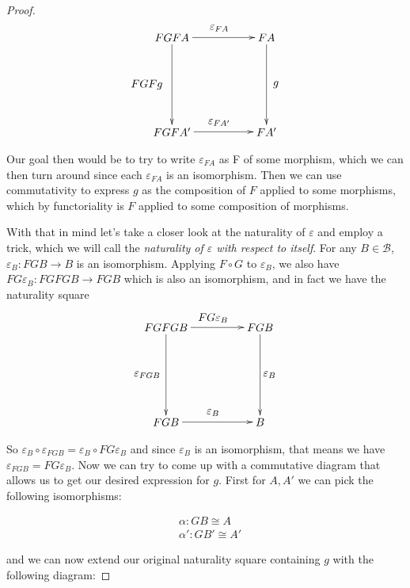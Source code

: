 \documentclass[11pt]{article}
\theoremstyle{definition}
\theoremstyle{plain}
\theoremstyle{plain}
\theoremstyle{plain}
\begin{document}
\begin{proof}
\begin{equation*}
\begin{xy}
(0,0)*+{FGFA}="a"; (30,0)*+{FA}="b";%
(0,-30)*+{FGFA'}="c"; (30,-30)*+{FA'}="d";
{\ar "a"; "b"}?*!/_3mm/{\varepsilon_{FA}};
{\ar "a"; "c"}?*!/^8mm/{FGFg};
{\ar "c"; "d"}?*!/_3mm/{\varepsilon_{FA'}};
{\ar "b";"d"}?*!/_3mm/{g};
\end{xy}
\end{equation*}

Our goal then would be to try to write $\varepsilon_{FA}$ as F of some morphism, which we can then turn around since each $\varepsilon_{FA}$ is an isomorphism. Then we can use commutativity to express $g$ as the composition of $F$ applied to some morphisms, which by functoriality is $F$ applied to some composition of morphisms.

With that in mind let's take a closer look at the naturality of $\varepsilon$ and employ a trick, which we will call the \emph{naturality of $\varepsilon$ with respect to itself}. For any $B\in\mathscr{B}$, $\varepsilon_{B}:FGB\to B$ is an isomorphism. Applying $F\circ G$ to $\varepsilon_{B}$, we also have $FG\varepsilon_{B}:FGFGB\to FGB$ which is also an isomorphism, and in fact we have the naturality square

\begin{equation*}
\begin{xy}
(0,0)*+{FGFGB}="a"; (30,0)*+{FGB}="b";%
(0,-30)*+{FGB}="c"; (30,-30)*+{B}="d";
{\ar "a"; "b"}?*!/_3mm/{FG\varepsilon_{B}};
{\ar "a"; "c"}?*!/^6mm/{\varepsilon_{FGB}};
{\ar "c"; "d"}?*!/_3mm/{\varepsilon_{B}};
{\ar "b";"d"}?*!/_3mm/{\varepsilon_{B}};
\end{xy}
\end{equation*}

So $\varepsilon_{B} \circ \varepsilon_{FGB} = \varepsilon_{B} \circ FG\varepsilon_{B}$ and since $\varepsilon_{B}$ is an isomorphism, that means we have $\varepsilon_{FGB} = FG\varepsilon_{B}$. Now we can try to come up with a commutative diagram that allows us to get our desired expression for $g$. First for $A,A'$ we can pick the following isomorphisms:

\begin{equation*}
\begin{aligned}
&\alpha: GB \cong A \\
&\alpha': GB' \cong A'
\end{aligned}
\end{equation*}

and we can now extend our original naturality square containing $g$ with the following diagram:


\end{proof}
\end{document}
